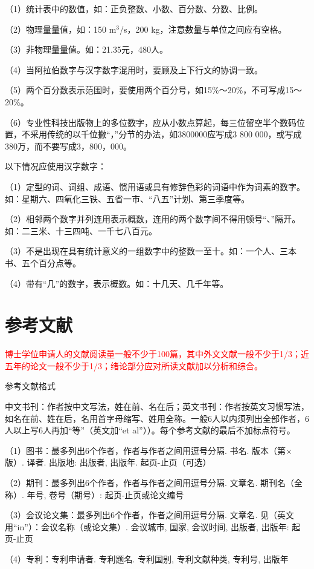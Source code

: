 （1）统计表中的数值，如：正负整数、小数、百分数、分数、比例。

（2）物理量量值，如：150 m$^3$/s，200 kg，注意数量与单位之间应有空格。

（3）非物理量量值。如：21.35元，480人。

（4）当阿拉伯数字与汉字数字混用时，要顾及上下行文的协调一致。

（5）两个百分数表示范围时，要使用两个百分号，如15\%～20\%，不可写成15～20\%。

（6）专业性科技出版物上的多位数字，应从小数点算起，每三位留空半个数码位置，不采用传统的以千位撇“，”分节的办法，如3800000应写成3 800 000，或写成380万，而不要写成3，800，000。

以下情况应使用汉字数字：

（1）定型的词、词组、成语、惯用语或具有修辞色彩的词语中作为词素的数字。如：星期六、四氧化三铁、五省一市、“八五”计划、第三季度等。

（2）相邻两个数字并列连用表示概数，连用的两个数字间不得用顿号“、”隔开。如：二三米、十三四吨、一千七八百元。

（3）不是出现在具有统计意义的一组数字中的整数一至十。如：一个人、三本书、五个百分点等。

（4）带有“几”的数字，表示概数。如：十几天、几千年等。

\section{参考文献}
\textcolor{red}{博士学位申请人的文献阅读量一般不少于100篇，其中外文文献一般不少于1/3；近五年的论文一般不少于1/3；绪论部分应对所读文献加以分析和综合。}

参考文献格式

中文书刊：作者按中文写法，姓在前、名在后；英文书刊：作者按英文习惯写法，如名在前、姓在后，名用首字母缩写、姓用全称。一般6人以内须列出全部作者，6人以上写6人再加“等”（英文加“et al”））。每个参考文献的最后不加标点符号。

（1）图书：最多列出6个作者，作者与作者之间用逗号分隔. 书名. 版本（第×版）. 译者. 出版地: 出版者, 出版年. 起页-止页（可选）

（2）期刊：最多列出6个作者，作者与作者之间用逗号分隔. 文章名. 期刊名（全称）. 年号, 卷号（期号）: 起页-止页或论文编号

（3）会议论文集：最多列出6个作者，作者之间用逗号分隔. 文章名. 见（英文用“in”）：会议名称（或论文集）. 会议城市, 国家, 会议时间, 出版者, 出版年: 起页-止页

（4）专利：专利申请者. 专利题名. 专利国别, 专利文献种类, 专利号, 出版年


